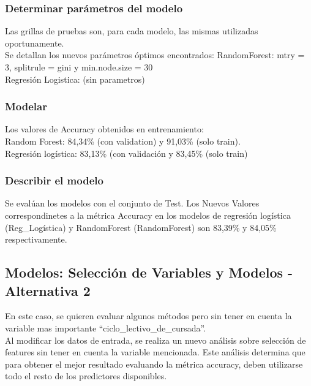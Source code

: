 \subsubsection{Determinar parámetros del modelo}

Las grillas de pruebas son, para cada modelo, las mismas utilizadas oportunamente.\\

Se detallan los nuevos parámetros óptimos encontrados: 
RandomForest: mtry = 3, splitrule = gini y min.node.size = 30\\
Regresión Logistica: (sin parametros)

\subsubsection{Modelar}

Los valores de Accuracy obtenidos en entrenamiento:\\
Random Forest: 84,34\% (con validation) y 91,03\% (solo train).\\
Regresión logística: 83,13\% (con validación y 83,45\% (solo train)



\subsubsection{Describir el modelo}

Se evalúan los modelos con el conjunto de Test.
Los Nuevos Valores correspondinetes a la métrica Accuracy en los modelos de regresión logística (Reg\_Logística) y RandomForest (RandomForest) son 83,39\% y 84,05\% respectivamente. %

\subsection{Modelos: Selección de Variables y Modelos - Alternativa 2}

En este caso, se quieren evaluar algunos métodos pero sin tener en cuenta la variable mas importante ``ciclo\_lectivo\_de\_cursada''.\\
Al modificar los datos de entrada, se realiza un nuevo análisis sobre selección de features sin tener en cuenta la variable mencionada. Este análisis determina que para obtener el mejor resultado evaluando la métrica accuracy, deben utilizarse todo el resto de los predictores disponibles. \\

